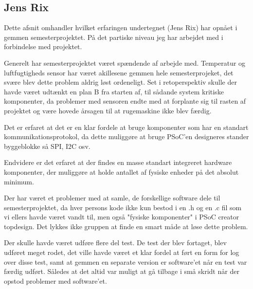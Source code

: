 
\subsection{Jens Rix}
Dette afsnit omhandler hvilket erfaringen undertegnet (Jens Rix) har opnået i gemmen semesterprojektet. På det partiske niveau jeg har arbejdet med i forbindelse med projektet.

Generelt har semesterprojektet været spændende af arbejde med. Temperatur og luftfugtigheds sensor har været akillesene gemmen hele semesterprojeket, det svære blev dette problem aldrig løst ordeneligt. Set i retoperspektiv skulle der havde været udtænkt en plan B fra starten af, til sådande system kritiske komponenter, da problemer med sensoren endte med at forplante sig til rasten af projektet og være hovede årsagen til at rugemaskine ikke blev færdig.

Det er erfaret at det er en klar fordele at bruge komponenter som har en standart kommunikationsprotokol, da dette muliggøre at bruge PSoC'en designeres stander byggeblokke så SPI, I2C osv.

Endvidere er det erfaret at der findes en masse standart integreret hardware komponenter, der muliggøre at holde antallet af fysiske enheder på det absolut minimum.

Der har været et problemer med at samle, de forskellige software dele til semesterprojektet, da hver persons kode ikke kun bestod i en .h og en .c fil som vi ellers havde været vandt til, men også "fysiske komponenter" i PSoC creator topdesign. Det lykkes ikke gruppen at finde en smart måde at løse dette problem.   

Der skulle havde været udføre flere del test. De test der blev fortaget, blev udføret meget rodet, det ville havde været et klar fordel at ført en form for log over disse test, samt at gemmen en separate version er software'et når en test var færdig udført. Således at det altid var muligt at gå tilbage i små skridt når der opstod problemer med software'et. 

    